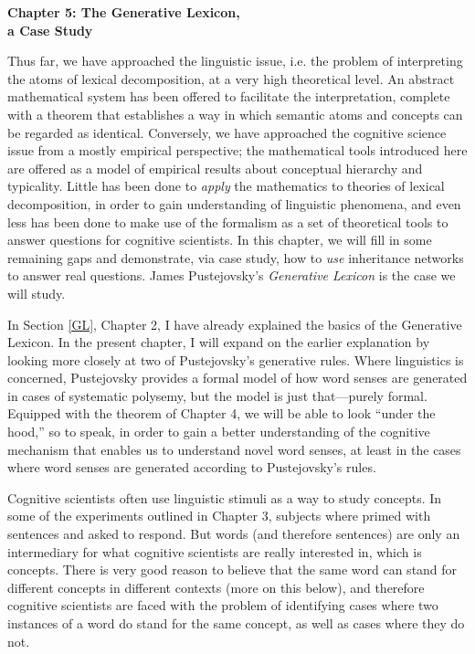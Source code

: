 \begin{center}
\Large \textbf{Chapter 5: The Generative Lexicon, \\ a Case Study} \\[1ex]
\end{center} 
\setcounter{section}{0}
Thus far, we have approached the linguistic issue, i.e. the problem of interpreting the atoms of lexical decomposition, at a very high theoretical level. An abstract mathematical system has been offered to facilitate the interpretation, complete with a theorem that establishes a way in which semantic atoms and concepts can be regarded as identical. Conversely, we have approached the cognitive science issue from a mostly empirical perspective; the mathematical tools introduced here are offered as a model of empirical results about conceptual hierarchy and typicality. Little has been done to \emph{apply} the mathematics to theories of lexical decomposition, in order to gain understanding of linguistic phenomena, and even less has been done to make use of the formalism as a set of theoretical tools to answer questions for cognitive scientists. In this chapter, we will fill in some remaining gaps and demonstrate, via case study, how to \emph{use} inheritance networks to answer real questions. James Pustejovsky's \emph{Generative Lexicon} \cite{pustejovsky_generative_1998} is the case we will study.

In Section \ref{GL}, Chapter 2, I have already explained the basics of the Generative Lexicon. In the present chapter, I will expand on the earlier explanation by looking more closely at two of Pustejovsky's generative rules. Where linguistics is concerned, Pustejovsky provides a formal model of how word senses are generated in cases of systematic polysemy, but the model is just that---purely formal. Equipped with the theorem of Chapter 4, we will be able to look ``under the hood,'' so to speak, in order to gain a better understanding of the cognitive mechanism that enables us to understand novel word senses, at least in the cases where word senses are generated according to Pustejovsky's rules.

Cognitive scientists often use linguistic stimuli as a way to study concepts. In some of the experiments outlined in Chapter 3, subjects where primed with sentences and asked to respond. But words (and therefore sentences) are only an intermediary for what cognitive scientists are really interested in, which is concepts. There is very good reason to believe that the same word can stand for different concepts in different contexts (more on this below), and therefore cognitive scientists are faced with the problem of identifying cases where two instances of a word do stand for the same concept, as well as cases where they do not.

